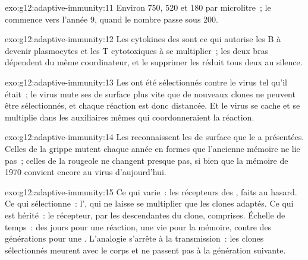 \begin{solution}{exo:g12:adaptive-immunity:11}
Environ 750, 520 et 180 par microlitre~; le  commence vers
l'année 9, quand le nombre passe sous 200.
\end{solution}

\begin{solution}{exo:g12:adaptive-immunity:12}
Les cytokines des  sont ce qui autorise les
 B à devenir plasmocytes et les  T cytotoxiques
à se multiplier~; les deux bras dépendent du même coordinateur, et le
supprimer les réduit tous deux au silence.
\end{solution}

\begin{solution}{exo:g12:adaptive-immunity:13}
Les  ont été sélectionnés contre le virus tel qu'il était~;
le virus mute ses  de surface plus vite que de nouveaux
clones ne peuvent être sélectionnés, et chaque réaction est donc
distancée. Et le virus se cache et se multiplie dans les 
auxiliaires mêmes qui coordonneraient la réaction.
\end{solution}

\begin{solution}{exo:g12:adaptive-immunity:14}
Les  reconnaissent les  de surface que le
 a présentées. Celles de la grippe mutent chaque année en formes
que l'ancienne mémoire ne lie pas~; celles de la rougeole ne changent
presque pas, si bien que la mémoire de 1970 convient encore au virus
d'aujourd'hui.
\end{solution}

\begin{solution}{exo:g12:adaptive-immunity:15}
Ce qui varie~: les récepteurs des , faits au hasard. Ce qui
sélectionne~: l', qui ne laisse se multiplier que les clones
adaptés. Ce qui est hérité~: le récepteur, par les descendantes du
clone,  comprises. Échelle de temps~: des jours pour
une réaction, une vie pour la mémoire, contre des générations pour une
. L'analogie s'arrête à la transmission~: les clones
sélectionnés meurent avec le corps et ne passent pas à la génération
suivante.
\end{solution}


